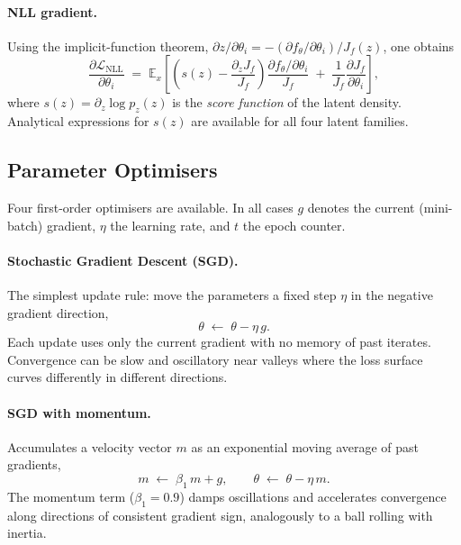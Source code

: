 \documentclass[11pt,a4paper]{article}
\newcommand{\E}{\mathbb{E}}
\newcommand{\pz}{p_z}
\newcommand{\ft}{f_{\!\theta}}
\newcommand{\Jf}{J_{\!f}}
\newcommand{\param}{\theta}
\begin{document}
\paragraph{NLL gradient.}
Using the implicit-function theorem, $\partial z/\partial\param_i =
-(\partial\ft/\partial\param_i)/\Jf(z)$, one obtains
\begin{equation}
  \frac{\partial\mathcal{L}_{\text{NLL}}}{\partial\param_i}
  \;=\;
  \E_x\!\left[
    \left(s(z) - \frac{\partial_z\Jf}{\Jf}\right)
    \frac{\partial\ft/\partial\param_i}{\Jf}
    \;+\;
    \frac{1}{\Jf}\frac{\partial\Jf}{\partial\param_i}
  \right],
\end{equation}
where $s(z) = \partial_z\log\pz(z)$ is the \emph{score function} of the
latent density.  Analytical expressions for $s(z)$ are available for all
four latent families.

\subsection{Parameter Optimisers}

Four first-order optimisers are available.  In all cases $g$ denotes the
current (mini-batch) gradient, $\eta$ the learning rate, and $t$ the epoch
counter.

\paragraph{Stochastic Gradient Descent (SGD).}
The simplest update rule: move the parameters a fixed step $\eta$ in the
negative gradient direction,
\begin{equation}
  \param \;\leftarrow\; \param - \eta\,g.
\end{equation}
Each update uses only the current gradient with no memory of past
iterates.  Convergence can be slow and oscillatory near valleys where the
loss surface curves differently in different directions.

\paragraph{SGD with momentum.}
Accumulates a velocity vector $m$ as an exponential moving average of
past gradients,
\begin{equation}
  m \;\leftarrow\; \beta_1\,m + g,\qquad
  \param \;\leftarrow\; \param - \eta\,m.
\end{equation}
The momentum term ($\beta_1 = 0.9$) damps oscillations and accelerates
convergence along directions of consistent gradient sign, analogously to a
ball rolling with inertia.
\end{document}
